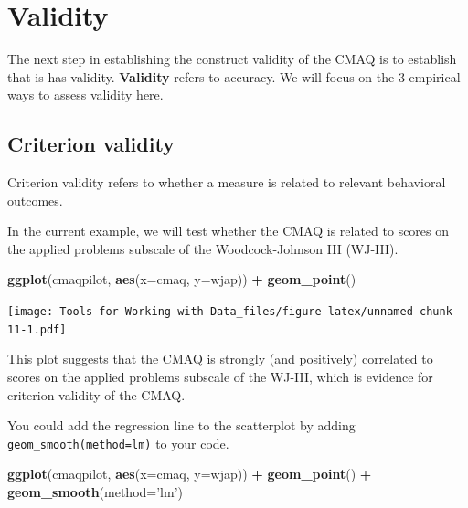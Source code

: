 \documentclass[
]{book}
\newenvironment{Shaded}{\begin{snugshade}}{\end{snugshade}}
\newcommand{\DataTypeTok}[1]{\textcolor[rgb]{0.13,0.29,0.53}{#1}}
\newcommand{\KeywordTok}[1]{\textcolor[rgb]{0.13,0.29,0.53}{\textbf{#1}}}
\newcommand{\NormalTok}[1]{#1}
\newcommand{\OperatorTok}[1]{\textcolor[rgb]{0.81,0.36,0.00}{\textbf{#1}}}
\newcommand{\StringTok}[1]{\textcolor[rgb]{0.31,0.60,0.02}{#1}}
\begin{document}
\hypertarget{validity}{%
\section{Validity}\label{validity}}

The next step in establishing the construct validity of the CMAQ is to establish that is has validity. \textbf{Validity} refers to accuracy. We will focus on the 3 empirical ways to assess validity here.

\hypertarget{criterion-validity}{%
\subsection{Criterion validity}\label{criterion-validity}}

Criterion validity refers to whether a measure is related to relevant behavioral outcomes.

In the current example, we will test whether the CMAQ is related to scores on the applied problems subscale of the Woodcock-Johnson III (WJ-III).

\begin{Shaded}
\begin{Highlighting}[]
\KeywordTok{ggplot}\NormalTok{(cmaqpilot, }\KeywordTok{aes}\NormalTok{(}\DataTypeTok{x=}\NormalTok{cmaq, }\DataTypeTok{y=}\NormalTok{wjap)) }\OperatorTok{+}
\StringTok{  }\KeywordTok{geom_point}\NormalTok{() }
\end{Highlighting}
\end{Shaded}

\texttt{[image: Tools-for-Working-with-Data\_files/figure-latex/unnamed-chunk-11-1.pdf]}

This plot suggests that the CMAQ is strongly (and positively) correlated to scores on the applied problems subscale of the WJ-III, which is evidence for criterion validity of the CMAQ.

You could add the regression line to the scatterplot by adding \texttt{geom\_smooth(method=\textquotesingle{}lm\textquotesingle{})} to your code.

\begin{Shaded}
\begin{Highlighting}[]
\KeywordTok{ggplot}\NormalTok{(cmaqpilot, }\KeywordTok{aes}\NormalTok{(}\DataTypeTok{x=}\NormalTok{cmaq, }\DataTypeTok{y=}\NormalTok{wjap)) }\OperatorTok{+}
\StringTok{  }\KeywordTok{geom_point}\NormalTok{() }\OperatorTok{+}
\StringTok{  }\KeywordTok{geom_smooth}\NormalTok{(}\DataTypeTok{method=}\StringTok{'lm'}\NormalTok{)}
\end{Highlighting}
\end{Shaded}
\end{document}
